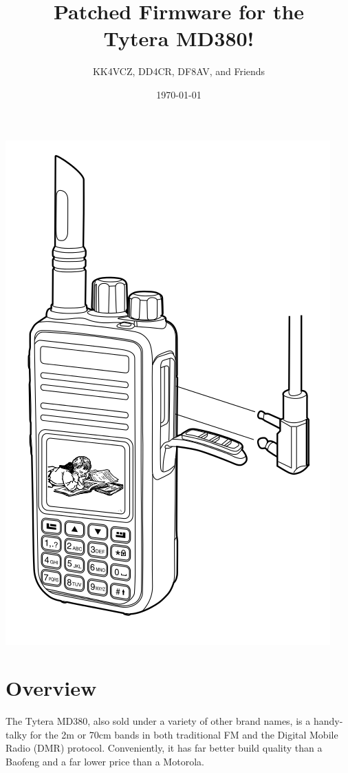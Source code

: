 \documentclass[
]{leaflet}
\title{Patched Firmware for the\\
Tytera MD380!}
\author{
  KK4VCZ, DD4CR, DF8AV, and Friends}
\date{\today}
\begin{document}
\maketitle
\thispagestyle{empty}




\noindent
\includegraphics[width=\columnwidth]{figures/md380}


\section{Overview}

The Tytera MD380, also sold under a variety of other brand names, is a
handy-talky for the 2m or 70cm bands in both traditional FM and the
Digital Mobile Radio (DMR) protocol.  Conveniently, it has far better
build quality than a Baofeng and a far lower price than a Motorola.
\end{document}
